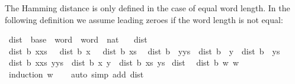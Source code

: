 \begin{isabellebody}
\begin{isamarkuptext}%
The Hamming distance is only defined in the case of equal word length.
In the following definition we assume leading zeroes if the word length
  is not equal:%
\end{isamarkuptext}\isamarkuptrue%
\isamarkupfalse%
\ dist\ {\isacharcolon}{\kern0pt}{\isacharcolon}{\kern0pt}\ {\isachardoublequoteopen}base\ {\isasymRightarrow}\ word\ {\isasymRightarrow}\ word\ {\isasymRightarrow}\ nat{\isachardoublequoteclose}\ \isanewline
\ \ {\isachardoublequoteopen}dist\ {\isacharunderscore}{\kern0pt}\ {\isacharbrackleft}{\kern0pt}{\isacharbrackright}{\kern0pt}\ {\isacharbrackleft}{\kern0pt}{\isacharbrackright}{\kern0pt}\ {\isacharequal}{\kern0pt}\ {}{\isachardoublequoteclose}\isanewline
{\isacharbar}{\kern0pt}\ {\isachardoublequoteopen}dist\ b\ {\isacharparenleft}{\kern0pt}x{\isacharhash}{\kern0pt}xs{\isacharparenright}{\kern0pt}\ {\isacharbrackleft}{\kern0pt}{\isacharbrackright}{\kern0pt}\ {\isacharequal}{\kern0pt}\ dist{}\ b\ x\ {}\ {\isacharplus}{\kern0pt}\ dist\ b\ xs\ {\isacharbrackleft}{\kern0pt}{\isacharbrackright}{\kern0pt}{\isachardoublequoteclose}\isanewline
{\isacharbar}{\kern0pt}\ {\isachardoublequoteopen}dist\ b\ {\isacharbrackleft}{\kern0pt}{\isacharbrackright}{\kern0pt}\ {\isacharparenleft}{\kern0pt}y{\isacharhash}{\kern0pt}ys{\isacharparenright}{\kern0pt}\ {\isacharequal}{\kern0pt}\ dist{}\ b\ {}\ y\ {\isacharplus}{\kern0pt}\ dist\ b\ {\isacharbrackleft}{\kern0pt}{\isacharbrackright}{\kern0pt}\ ys{\isachardoublequoteclose}\isanewline
{\isacharbar}{\kern0pt}\ {\isachardoublequoteopen}dist\ b\ {\isacharparenleft}{\kern0pt}x{\isacharhash}{\kern0pt}xs{\isacharparenright}{\kern0pt}\ {\isacharparenleft}{\kern0pt}y{\isacharhash}{\kern0pt}ys{\isacharparenright}{\kern0pt}\ {\isacharequal}{\kern0pt}\ dist{}\ b\ x\ y\ {\isacharplus}{\kern0pt}\ dist\ b\ xs\ ys{\isachardoublequoteclose}\isanewline
\isanewline
{}\isamarkupfalse%
\ dist{\isacharunderscore}{\kern0pt}{}{\isacharcolon}{\kern0pt}\isanewline
\ \ {\isachardoublequoteopen}dist\ b\ w\ w\ {\isacharequal}{\kern0pt}\ {}{\isachardoublequoteclose}\isanewline
%
\isadelimproof
\ \ %
\endisadelimproof
%
\isatagproof
{}\isamarkupfalse%
\ {\isacharparenleft}{\kern0pt}induction\ w{\isacharparenright}{\kern0pt}\isanewline
\ \ \isamarkupfalse%
\ {\isacharparenleft}{\kern0pt}auto\ simp\ add{\isacharcolon}{\kern0pt}\ dist{}{\isacharunderscore}{\kern0pt}{}{\isacharparenright}{\kern0pt}%

\end{isabellebody}

